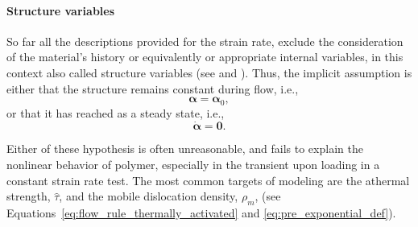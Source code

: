 
\paragraph{Structure variables}
So far all the descriptions provided for the strain rate, exclude the consideration of the material's history or equivalently or appropriate internal variables, in this context also called structure variables (see \cite{kocks1975thermodynamics} and \cite{frostDeformationmechanismMapsPlasticity1982}).
Thus, the implicit assumption is either that the structure remains constant during flow, i.e.,
\begin{equation}
  \bm \alpha = \bm \alpha_0,
\end{equation}
or that it has reached as a steady state, i.e.,
\begin{equation}
  \dot{\bm \alpha} = \bm 0.
\end{equation}

Either of these hypothesis is often unreasonable, and fails to explain the nonlinear behavior of polymer, especially in the transient upon loading in a constant strain rate test.
The most common targets of modeling are the athermal strength, $\hat \tau$, and the mobile dislocation density, $\rho_m$, (see Equations~\eqref{eq:flow_rule_thermally_activated} and \eqref{eq:pre_exponential_def}).

